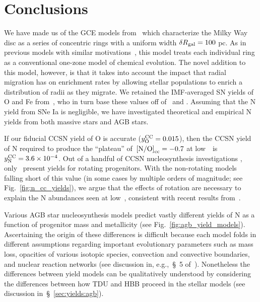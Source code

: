\documentclass[ms.tex]{subfiles}
\begin{document}
\section{Conclusions}
\label{sec:conclusions}

We have made us of the GCE models from~\citet{Johnson2021} which characterize
the Milky Way disc as a series of concentric rings with a uniform width
$\delta R_\text{gal} = 100$ pc.
As in previous models with similar motivations~\citep{Matteucci1989,
Wyse1989, Prantzos1995, Schoenrich2009, Minchev2013, Minchev2014, Minchev2017,
Sharma2021}, this model treats each individual ring as a conventional one-zone
model of chemical evolution.
The novel addition to this model, however, is that it takes into account the
impact that radial migration has on enrichment rates by allowing stellar
populations to enrich a distribution of radii as they migrate.
We retained the IMF-averaged SN yields of O and Fe from~\citet{Johnson2021},
who in turn base these values off of~\citet{Weinberg2017} and
\citet{Johnson2020}.
Assuming that the N yield from SNe Ia is negligible, we have investigated
theoretical and empirical N yields from both massive stars and AGB stars.
\par
If our fiducial CCSN yield of O is accurate ($y_\text{O}^\text{CC} = 0.015$), then the CCSN
yield of N required to produce the ``plateau'' of~$\text{[N/O]}_\text{cc} = -0.7$ at
low~\oh~is~$y_\text{N}^\text{CC} = 3.6\times10^{-4}$.
Out of a handful of CCSN nucleosynthesis investigations
\citep[e.g.][]{Woosley1995, Nomoto2013, Sukhbold2016}, only~\citet{Limongi2018}
present yields for rotating progenitors.
With the non-rotating models falling short of this value (in some cases by
multiple orders of magnitude; see Fig.~\ref{fig:n_cc_yields}), we argue that
the effects of rotation are necessary to explain the N abundances seen at
low~\oh, consistent with recent results from~\citet{Grisoni2021}.
\par
Various AGB star nucleosynthesis models predict vastly different yields of N
as a function of progenitor mass and metallicity (see
Fig.~\ref{fig:agb_yield_models}).
Ascertaining the origin of these differences is difficult because each model
folds in different assumptions regarding important evolutionary parameters such
as mass loss, opacities of various isotopic species, convection and convective
boundaries, and nuclear reaction networks (see discussion in, e.g.,~\S~5
of~\citealp{Karakas2016}).
Nonetheless the differences between yield models can be qualitatively
understood by considering the differences between how TDU and HBB proceed in
the stellar models (see discussion in~\S~\ref{sec:yields:agb}).
\end{document}
